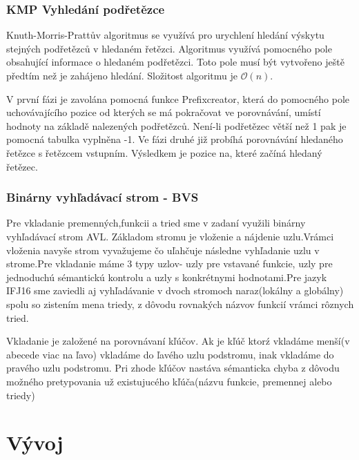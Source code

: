 \documentclass[12pt,a4paper]{report}
\begin{document}
\subsection{KMP Vyhledání podřetězce}
\par Knuth-Morris-Prattův algoritmus se využívá pro urychlení hledání výskytu stejných podřetězců v hledaném řetězci. Algoritmus využívá pomocného pole obsahující informace o hledaném podřetězci. Toto pole musí být vytvořeno ještě předtím než je zahájeno hledání. Složitost algoritmu je $\mathcal{O}(n)$.
\par V první fázi je zavolána pomocná funkce Prefixcreator, která do pomocného pole uchovávajícího pozice od kterých se má pokračovat ve porovnávání, umístí hodnoty na základě nalezených podřetězců. Není-li podřetězec větší než 1 pak je pomocná tabulka vyplněna -1.
Ve fázi druhé již probíhá porovnávání hledaného řetězce s řetězcem vstupním. Výsledkem je pozice na, které začíná hledaný řetězec.


\subsection{Binárny vyhľadávací strom - BVS}
\par Pre vkladanie premenných,funkcii a tried sme v zadaní využili binárny vyhľadávací strom AVL. Základom stromu je vloženie a nájdenie uzlu.Vrámci vloženia navyše strom vyvažujeme čo uľahčuje následne vyhľadanie uzlu v strome.Pre vkladanie máme 3 typy uzlov- uzly pre vstavané funkcie, uzly pre jednoduchú sémantickú kontrolu a uzly s konkrétnymi hodnotami.Pre jazyk IFJ16 sme zaviedli aj vyhľadávanie v dvoch stromoch naraz(lokálny a globálny) spolu so zistením mena triedy, z dôvodu rovnakých názvov funkcií vrámci rôznych tried.
\par Vkladanie je založené na porovnávaní kľúčov. Ak je kľúč ktorź vkladáme menší(v abecede viac na ľavo) vkladáme do ľavého uzlu podstromu, inak vkladáme do pravého uzlu podstromu. Pri zhode kľúčov nastáva sémanticka chyba z dôvodu možného pretypovania už existujucého kľúča(názvu funkcie, premennej alebo triedy)

\chapter{Vývoj}
\end{document}
